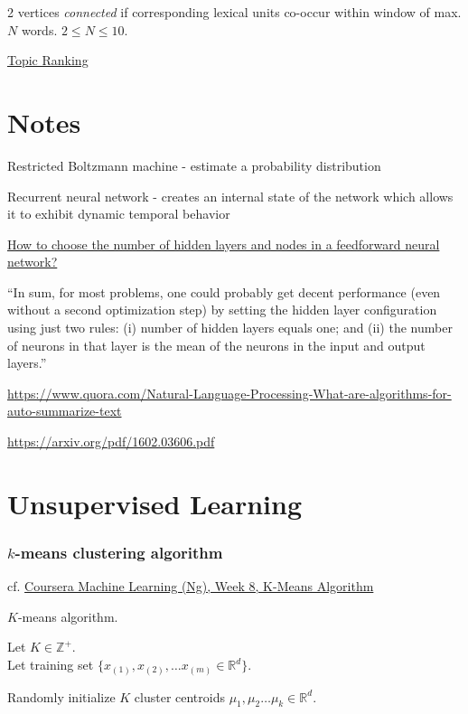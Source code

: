\documentclass[10pt]{amsart}
\begin{document}
\begin{multicols*}{2}
2 vertices \emph{connected} if corresponding lexical units co-occur within window of max. $N$ words.  $2\leq N \leq 10$.  

\href{http://www.aclweb.org/anthology/I13-1062}{Topic Ranking}




\part{Notes}


Restricted Boltzmann machine - estimate a probability distribution

Recurrent neural network - creates an internal state of the network which allows it to exhibit dynamic temporal behavior


\href{http://stats.stackexchange.com/questions/181/how-to-choose-the-number-of-hidden-layers-and-nodes-in-a-feedforward-neural-netw}{How to choose the number of hidden layers and nodes in a feedforward neural network?}

``In sum, for most problems, one could probably get decent performance (even without a second optimization step) by setting the hidden layer configuration using just two rules: (i) number of hidden layers equals one; and (ii) the number of neurons in that layer is the mean of the neurons in the input and output layers.''


\url{https://www.quora.com/Natural-Language-Processing-What-are-algorithms-for-auto-summarize-text}

\url{https://arxiv.org/pdf/1602.03606.pdf}


\part{Unsupervised Learning}

\section{$k$-means clustering algorithm}

cf. \href{https://www.coursera.org/learn/machine-learning/lecture/93VPG/k-means-algorithm}{Coursera Machine Learning (Ng), Week 8, K-Means Algorithm}

$K$-means algorithm.  

Let $K\in \mathbb{Z}^+$.  \\
Let training set $\lbrace x_{(1)}, x_{(2)}, \dots x_{(m)} \in \mathbb{R}^d \rbrace$.  

Randomly initialize $K$ cluster centroids $\mu_1,\mu_2\dots \mu_k \in \mathbb{R}^d$.  


\end{multicols*}
\end{document}
